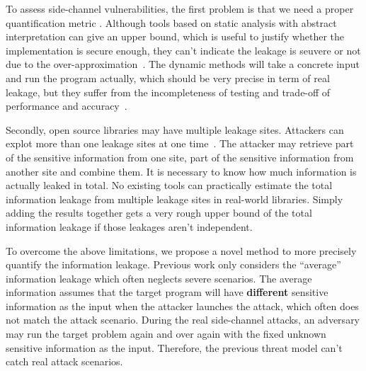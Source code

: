 To assess side-channel vulnerabilities, the first problem is that we need a proper quantification metric .
Although tools based on static analysis with abstract interpretation can give an upper bound, 
which is useful to justify whether the implementation is secure enough, 
they can’t indicate the leakage is seuvere or not due to the over-approximation~\cite{}. 
The dynamic methods will take a concrete input and run the program actually, which should be very precise in term of real leakage,
but they suffer from the incompleteness of testing and trade-off of performance and accuracy~\cite{}. 

Secondly, open source libraries may have multiple leakage sites. Attackers can explot more than one leakage
sites at one time~\cite{191010,7163052,hornby2011side}. 
The attacker may retrieve part of the sensitive information from one site, part of the sensitive
information from another site and combine them.
It is necessary to know how much information is actually leaked in total. 
No existing tools can practically estimate the total information leakage from multiple leakage sites in real-world libraries.
Simply adding the results together gets a very rough upper bound of the total information leakage if those 
leakages aren’t independent. 


To overcome the above limitations, we propose a novel method
to more precisely quantify the information leakage. Previous work only considers the
``average'' information leakage which often neglects severe scenarios.
The average information assumes that the target program will have \textbf{different} sensitive 
information as the input when the attacker launches the attack,
which often does not match the attack scenario. During the real side-channel
attacks, an adversary may run the target problem again and over again with the 
fixed unknown sensitive information as the input. Therefore, the previous
threat model can't catch real attack scenarios.

